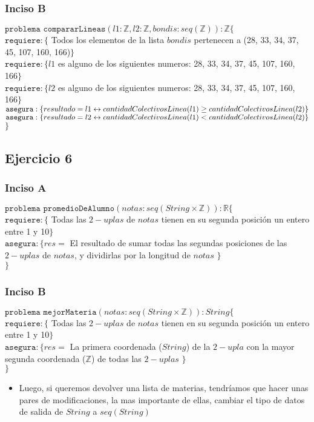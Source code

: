 	\subsubsection{Inciso B}
	$\texttt{problema compararLineas}(l1:\mathbb{Z},l2:\mathbb{Z},bondis:seq(\mathbb{Z})) : \mathbb{Z} \lbrace$\\
	$\texttt{requiere}:\lbrace$ Todos los elementos de la lista $bondis$ pertenecen a (28, 33, 34, 37, 45, 107, 160, 166)$\rbrace$\\
	$\texttt{requiere}:\lbrace l1$ es alguno de los siguientes numeros: 28, 33, 34, 37, 45, 107, 160, 166$\rbrace$\\
	$\texttt{requiere}:\lbrace l2$ es alguno de los siguientes numeros: 28, 33, 34, 37, 45, 107, 160, 166$\rbrace$\\
	$\texttt{asegura}:\lbrace resultado=l1 \leftrightarrow cantidadColectivosLinea(l1)\geq cantidadColectivosLinea(l2)\rbrace$\\
	$\texttt{asegura}:\lbrace resultado=l2 \leftrightarrow cantidadColectivosLinea(l1)< cantidadColectivosLinea(l2)\rbrace$\\
	$\rbrace$
	
	\subsection{Ejercicio 6}
	\subsubsection{Inciso A}
	$\texttt{problema promedioDeAlumno}(notas:seq(String \times \mathbb{Z})) : \mathbb{R} \lbrace$\\
	$\texttt{requiere}:\lbrace$ Todas las $2-uplas$ de $notas$ tienen en su segunda posición un entero entre 1 y 10$\rbrace$\\
	$\texttt{asegura}:\lbrace res =$ El resultado de sumar todas las segundas posiciones de las $2-uplas$ de $notas$, y dividirlas por la longitud de $notas$ $\rbrace$\\
	$\rbrace$
	
	\subsubsection{Inciso B}
	$\texttt{problema mejorMateria}(notas:seq(String \times \mathbb{Z})) : String \lbrace$\\
	$\texttt{requiere}:\lbrace$ Todas las $2-uplas$ de $notas$ tienen en su segunda posición un entero entre 1 y 10$\rbrace$\\
	$\texttt{asegura}:\lbrace res=$ La primera coordenada ($String$) de la $2-upla$ con la mayor segunda coordenada ($\mathbb{Z}$) de todas las $2-uplas$ $\rbrace$\\
	$\rbrace$\\
	\begin{itemize}
	\item Luego, si queremos devolver una lista de materias, tendríamos que hacer unas pares de modificaciones, la mas importante de ellas, cambiar el tipo de datos de salida de $String$ a $seq(String)$
	\end{itemize}
	
